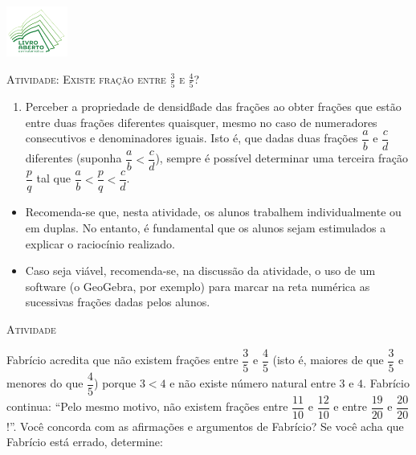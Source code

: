 \documentclass[10 pt,usenames,dvipsnames, oneside]{article}
\begin{document}
\begin{center}
  \begin{minipage}[l]{3cm}
\includegraphics[width=2cm]{../../../Figuras/logo}       
\end{minipage}\hfill
\begin{minipage}[r]{.8\textwidth}
 {\Large \scshape Atividade: Existe fração entre $\frac{3}{5}$ e $\frac{4}{5}$?}  
\end{minipage}
\end{center}
\vspace{.2cm}

\ifdefined\prof
\begin{goals}
\begin{enumerate}
\item       Perceber a propriedade de densidßade das frações ao obter frações
que estão entre duas frações diferentes quaisquer, mesmo no caso de numeradores
consecutivos e denominadores iguais. Isto é, que dadas duas frações
$\dfrac{a}{b}$       e       $\dfrac{c}{d}$       diferentes (suponha
$\dfrac{a}{b}<\dfrac{c}{d}$), sempre é possível determinar uma terceira fração
  $\dfrac{p}{q}$       tal que       $\dfrac{a}{b}<\dfrac{p}{q}<\dfrac{c}{d}$.
\end{enumerate}

\tcblower

\begin{itemize}
\item       Recomenda-se que, nesta atividade, os alunos trabalhem
individualmente ou em duplas. No entanto, é fundamental que os alunos sejam
estimulados a explicar o raciocínio realizado.
    \item       Caso seja viável, recomenda-se, na discussão da atividade, o uso
de um software (o GeoGebra, por exemplo) para marcar na reta numérica as
sucessivas frações dadas pelos alunos.
\end{itemize}
\end{goals}

\bigskip
\begin{center}
{\large \scshape Atividade}
\end{center}
\fi

Fabrício acredita que não existem frações entre $\dfrac{3}{5}$ e $\dfrac{4}{5}$ (isto é, maiores de que $\dfrac{3}{5}$ e menores do que $\dfrac{4}{5}$) porque $3 < 4$ e não existe número natural entre $3$ e $4$. Fabrício continua: ``Pelo mesmo motivo, não existem frações entre $\dfrac{11}{10}$ e $\dfrac{12}{10}$ e entre $\dfrac{19}{20}$ e $\dfrac{20}{20}$!''. Você concorda com as afirmações e argumentos de Fabrício? Se você acha que Fabrício está errado, determine:
\end{document}
